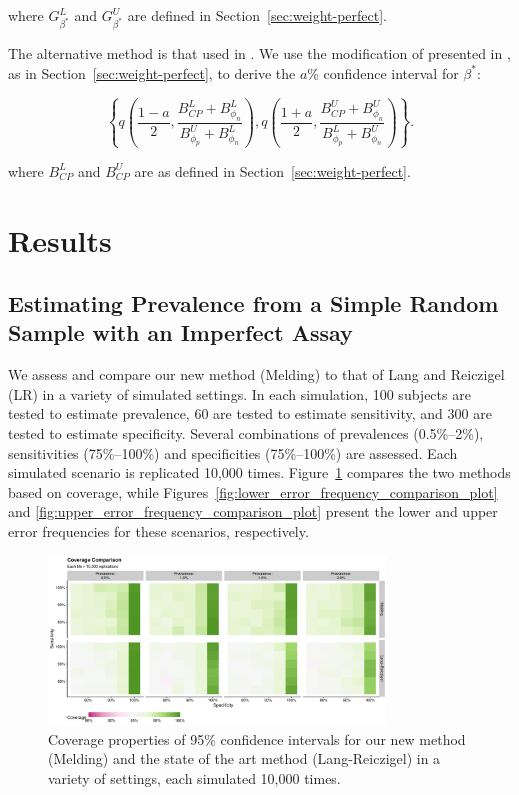 \documentclass[AMA,STIX1COL]{WileyNJD-v2}
\begin{document}
where  \( G_{\beta^*}^L \) and \( G_{\beta^*}^U \) are defined in Section~\ref{sec:weight-perfect}.

The alternative method is that used in \cite{Kali:2021}.
We use the  modification of \cite{Korn:1998} presented in \cite{Dean:2015}, as in Section~\ref{sec:weight-perfect}, to derive the \( a \)\% confidence interval for \( \beta^* \):

\begin{equation}
    \left\{ q \left( \frac{1 - a}{2}, \frac{B_{CP}^L + B_{\phi_n}^L }{B_{\phi_p}^U + B_{\phi_n}^L }  \right),  q \left( \frac{1 + a}{2}, \frac{B_{CP}^U + B_{\phi_n}^U}{B_{\phi_p}^L + B_{\phi_n}^U}  \right) \right\}.
\end{equation}

where \( B_{CP}^L \) and \( B_{CP}^U \) are as defined in Section~\ref{sec:weight-perfect}.

\section{Results}

\subsection{Estimating Prevalence from a Simple Random Sample with an Imperfect Assay}

We assess and compare our new method (Melding) to that of Lang and Reiczigel (LR) in a variety of simulated settings.
In each simulation, 100 subjects are tested to estimate prevalence, 60 are tested to estimate sensitivity, and 300 are tested to estimate specificity.
Several combinations of prevalences (0.5\%--2\%), sensitivities (75\%--100\%) and specificities (75\%--100\%) are assessed.
Each simulated scenario is replicated 10,000 times.
Figure~\ref{fig:coverage_comparison_plot} compares the two methods based on coverage, while Figures~\ref{fig:lower_error_frequency_comparison_plot} and \ref{fig:upper_error_frequency_comparison_plot} present the lower and upper error frequencies for these scenarios, respectively.

\begin{figure}
    \centering
    \includegraphics[width=0.8\textwidth]{figures/simple_coverage_comparison_plot.pdf}
    \caption{Coverage properties of 95\% confidence intervals for our new method (Melding) and the state of the art method (Lang-Reiczigel) in a variety of settings, each simulated 10,000 times.}
    \label{fig:coverage_comparison_plot}
\end{figure}
\end{document}
